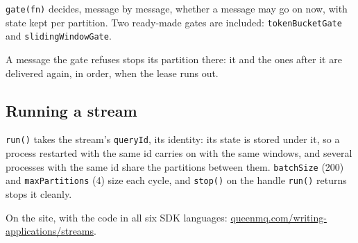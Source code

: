 \texttt{gate(fn)} decides, message by message, whether a message may go on now, with state kept per
partition. Two ready-made gates are included: \texttt{tokenBucketGate} and
\texttt{slidingWindowGate}.


A message the gate refuses stops its partition there: it and the ones after it are delivered again,
in order, when the lease runs out.


\subsection{Running a stream}

\texttt{run()} takes the stream's \texttt{queryId}, its identity: its state is stored under it, so a
process restarted with the same id carries on with the same windows, and several processes with the
same id share the partitions between them. \texttt{batchSize} (200) and \texttt{maxPartitions} (4)
size each cycle, and \texttt{stop()} on the handle \texttt{run()} returns stops it cleanly.


On the site, with the code in all six SDK languages: \href{https://queenmq.com/writing-applications/streams/}{queenmq.com/writing-applications/streams}.
